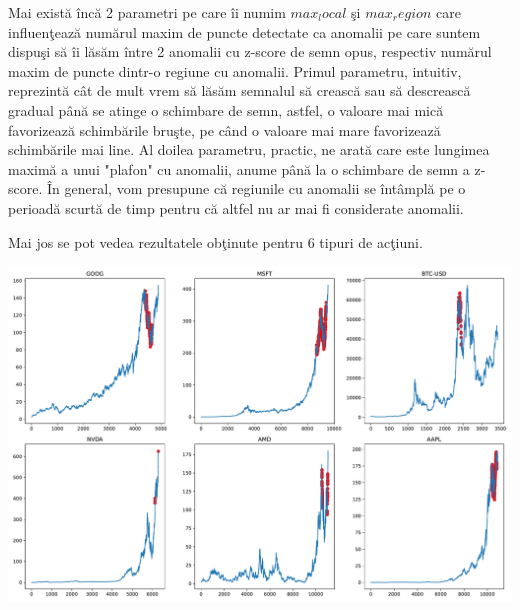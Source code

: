 Mai există încă 2 parametri pe care îi numim $max_local$ şi $max_region$ care influenţează numărul maxim de puncte detectate ca
anomalii pe care suntem dispuşi să îi lăsăm între 2 anomalii cu z-score de semn opus, respectiv numărul maxim de puncte dintr-o regiune
cu anomalii. Primul parametru, intuitiv, reprezintă cât de mult vrem să lăsăm semnalul să crească sau să descrească gradual până se atinge 
o schimbare de semn, astfel, o valoare mai mică favorizează schimbările bruşte, pe când o valoare mai mare favorizează schimbările mai line.
Al doilea parametru, practic, ne arată care este lungimea maximă a unui "plafon" cu anomalii, anume până la o schimbare de semn a z-score.
În general, vom presupune că regiunile cu anomalii se întâmplă pe o perioadă scurtă de timp pentru că altfel nu ar mai fi considerate anomalii.

Mai jos se pot vedea rezultatele obţinute pentru 6 tipuri de acţiuni.

\includegraphics[width=\linewidth]{images/fft_results.pdf}